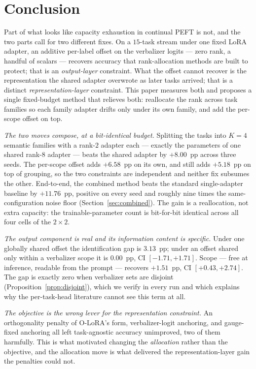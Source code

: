\section{Conclusion}
\label{sec:conclusion}

Part of what looks like capacity exhaustion in continual PEFT is not, and the two
parts call for two different fixes. On a $15$-task stream under one fixed LoRA
adapter, an additive per-label offset on the verbalizer logits --- zero rank, a
handful of scalars --- recovers accuracy that rank-allocation methods are built to
protect; that is an \emph{output-layer} constraint. What the offset cannot recover
is the representation the shared adapter overwrote as later tasks arrived; that is a
distinct \emph{representation-layer} constraint. This paper measures both and
proposes a single fixed-budget method that relieves both: reallocate the rank across
task families so each family adapter drifts only under its own family, and add the
per-scope offset on top.

\emph{The two moves compose, at a bit-identical budget.} Splitting the tasks into
$K{=}4$ semantic families with a rank-$2$ adapter each --- exactly the parameters of
one shared rank-$8$ adapter --- beats the shared adapter by $+8.00$~pp across three
seeds. The per-scope offset adds $+6.58$~pp on its own, and still adds $+5.18$~pp on
top of grouping, so the two constraints are independent and neither fix subsumes the
other. End-to-end, the combined method beats the standard single-adapter baseline by
$+11.76$~pp, positive on every seed and roughly nine times the same-configuration
noise floor (Section~\ref{sec:combined}). The gain is a reallocation, not extra
capacity: the trainable-parameter count is bit-for-bit identical across all four
cells of the $2\times2$.

\emph{The output component is real and its information content is specific.} Under
one globally shared offset the identification gap is $3.13$~pp; under an offset
shared only within a verbalizer scope it is $0.00$~pp, CI $[-1.71,+1.71]$. Scope ---
free at inference, readable from the prompt --- recovers $+1.51$~pp, CI
$[+0.43,+2.74]$. The gap is exactly zero when verbalizer sets are disjoint
(Proposition~\ref{prop:disjoint}), which we verify in every run and which explains
why the per-task-head literature cannot see this term at all.

\emph{The objective is the wrong lever for the representation constraint.} An
orthogonality penalty of O-LoRA's form, verbalizer-logit anchoring, and gauge-fixed
anchoring all left task-agnostic accuracy unimproved, two of them harmfully. This is
what motivated changing the \emph{allocation} rather than the objective, and the
allocation move is what delivered the representation-layer gain the penalties could
not.

